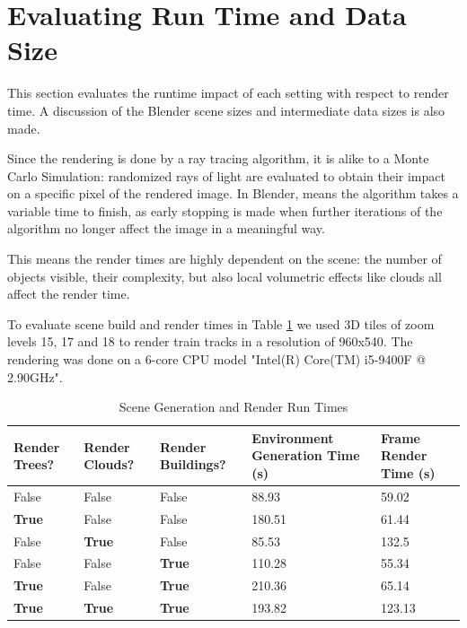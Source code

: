 \section{Evaluating Run Time and Data Size}
\label{sec:evaluate-runtime}


This section evaluates the runtime impact of each setting with respect to render time. A discussion of the Blender scene sizes and intermediate data sizes is also made. 


Since the rendering is done by a ray tracing algorithm, it is alike to a Monte Carlo Simulation: randomized rays of light are evaluated to obtain their impact on a specific pixel of the rendered image. In Blender, means the algorithm takes a variable time to finish, as early stopping is made when further iterations of the algorithm no longer affect the image in a meaningful way.

This means the render times are highly dependent on the scene: the number of objects visible, their complexity, but also local volumetric effects like clouds all affect the render time.

To evaluate scene build and render times in Table \ref{fig:run-time-table} we used 3D tiles of zoom levels 15, 17 and 18 to render train tracks in a resolution of 960x540. The rendering was done on a 6-core CPU model "Intel(R) Core(TM) i5-9400F @ 2.90GHz".

\begin{table}[H]
\centering
\begin{tabular}{|p{1.5cm}|p{1.5cm}|p{1.5cm}|p{3cm}|p{3cm}|}
\hline
    Render Trees? & Render Clouds? & Render Buildings? & Environment Generation Time (s) & Frame Render Time (s) \\
\hline
    False & False & False &  88.93 & 59.02 \\
\hline
    \textbf{True} & False & False & 180.51 & 61.44 \\
\hline
    False & \textbf{True} & False & 85.53 & 132.5 \\
\hline
    False & False & \textbf{True} & 110.28 & 55.34 \\
\hline
    \textbf{True} & False & \textbf{True} & 210.36 & 65.14 \\
\hline
    \textbf{True} & \textbf{True} & \textbf{True} & 193.82 & 123.13 \\
\hline
\end{tabular}
\caption{Scene Generation and Render Run Times}
\label{fig:run-time-table}
\end{table}

